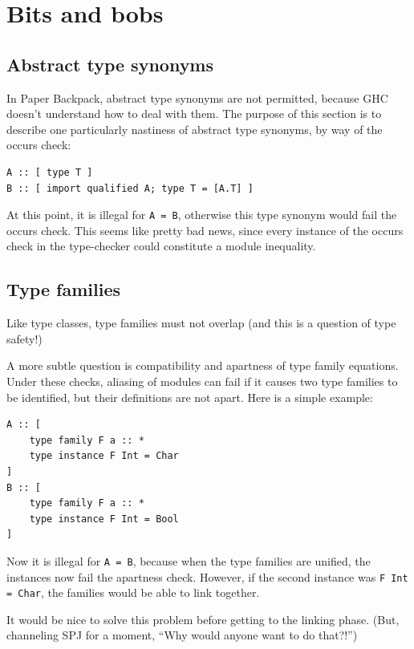 \documentclass{article}
\begin{document}
\section{Bits and bobs}

\subsection{Abstract type synonyms}

In Paper Backpack, abstract type synonyms are not permitted, because GHC doesn't
understand how to deal with them.  The purpose of this section is to describe
one particularly nastiness of abstract type synonyms, by way of the occurs check:

\begin{verbatim}
A :: [ type T ]
B :: [ import qualified A; type T = [A.T] ]
\end{verbatim}

At this point, it is illegal for \verb|A = B|, otherwise this type synonym would
fail the occurs check.  This seems like pretty bad news, since every instance
of the occurs check in the type-checker could constitute a module inequality.

\subsection{Type families}

Like type classes, type families must not overlap (and this is a question of
type safety!)

A more subtle question is compatibility and apartness of type family
equations.  Under these checks, aliasing of modules can fail if it causes
two type families to be identified, but their definitions are not apart.
Here is a simple example:

\begin{verbatim}
A :: [
    type family F a :: *
    type instance F Int = Char
]
B :: [
    type family F a :: *
    type instance F Int = Bool
]
\end{verbatim}

Now it is illegal for \verb|A = B|, because when the type families are
unified, the instances now fail the apartness check.  However, if the second
instance was \verb|F Int = Char|, the families would be able to link together.

It would be nice to solve this problem before getting to the linking phase. (But,
channeling SPJ for a moment, ``Why would anyone want to do that?!'')
\end{document}
